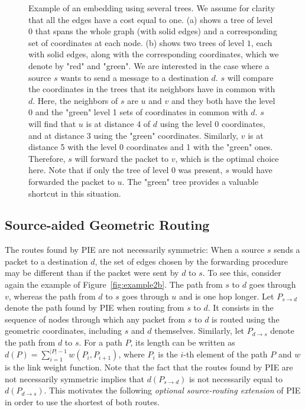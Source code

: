 \documentclass[conference]{IEEEtran}
\begin{document}
\begin{figure}[t]
\vspace{0.1in}
\centering
{}\hfil
{}
\caption{Example of an embedding using several trees. We assume for  clarity that all the edges have a cost equal to one. (a) shows a tree of level $0$ that spans the whole graph (with solid edges) and a corresponding set of coordinates at each node. (b) shows two trees of level $1$, each with solid edges, along with the corresponding coordinates, which we denote by "red" and "green". We are interested in the case where a source $s$ wants to send a message to a destination $d$. $s$ will compare the coordinates in the trees that its neighbors have in common with $d$. Here, the neighbors of $s$ are $u$ and $v$ and they both have the level 0 and the "green" level 1 sets of coordinates in common with $d$. $s$ will find that $u$ is at distance 4 of $d$ using the level 0 coordinates, and at distance 3 using the "green" coordinates. Similarly, $v$ is at distance 5 with the level 0 coordinates and 1 with the "green" ones. Therefore, $s$ will forward the packet to $v$, which is the optimal choice here. Note that if only the tree of level 0 was present, $s$ would have forwarded the packet to $u$. The "green" tree provides a valuable shortcut in this situation.}
\vspace{-1.5em}
\label{fig:example2}
\end{figure}



\subsection{Source-aided Geometric Routing}
\label{sec:asym}
The routes found by PIE are not necessarily symmetric: When a source $s$ sends a packet to a destination $d$, the set of edges chosen by the forwarding procedure may be different than if the packet were sent by $d$ to $s$. To see this, consider again the example of Figure~\ref{fig:example2b}. The path from $s$ to $d$ goes through $v$, whereas the path from $d$ to $s$ goes through $u$ and is one hop longer.
Let $P_{s \rightarrow d}$ denote the path found by PIE when routing from $s$ to $d$.
It consists in the sequence of nodes through which any packet from $s$ to $d$ is routed using the geometric coordinates, including $s$ and $d$ themselves.
Similarly, let $P_{d \rightarrow s}$ denote the path from $d$ to $s$.
For a path $P$, its length can be written as $d(P) = \sum_{i=1}^{|P|-1}{w(P_{i},P_{i+1})}$, where $P_i$ is the $i$-th element of the path $P$ and $w$ is the link weight function. Note that the fact that the routes found by PIE are not necessarily symmetric implies that $d(P_{s \rightarrow d})$ is not necessarily equal to $d(P_{d \rightarrow s})$. This motivates the following \emph{optional source-routing extension} of PIE in order to use the shortest of both routes.
\end{document}
